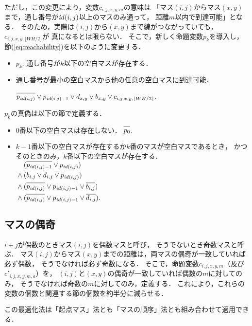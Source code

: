 \documentclass[a4j]{jarticle}
\newcommand{\N}[1]{\overline{#1\vphantom{l}}}
\newcommand{\←}{{\leftarrow}}
\newcommand{\→}{{\rightarrow}}
\newcommand{\↑}{{\uparrow}}
\newcommand{\↓}{{\downarrow}}
\begin{document}
ただし，この変更により，変数$c_{i,j,x,y,m}$の意味は
「マス$(i,j)$からマス$(x,y)$まで，通し番号が$\mathit{id}(i,j)$以上のマスのみ通って，
距離$m$以内で到達可能」となる．
そのため，実際は$(i,j)$から$(x,y)$まで線がつながっていても，
$c_{i,j,x,y,\lfloor WH/2\rfloor}$が
真になるとは限らない．
そこで，新しく命題変数$p_k$を導入し，
節(\ref{eq:reachability})を以下のように変更する．
\begin{itemize}
\item $p_k$: 通し番号が$k$以下の空白マスが存在する．
\item 通し番号が最小の空白マスから他の任意の空白マスに到達可能．
  \par\qquad
  $\N{p_{\id(i,j)}}\lor{p_{\id(i,j)-1}}\lor
   d_{x,y}\lor b_{x,y}\lor
   c_{i,j,x,y,\lfloor WH/2\rfloor}$.

\end{itemize}
%
$p_k$の真偽は以下の節で定義する．
\begin{itemize}
\item $0$番以下の空白マスは存在しない．
  $\N{p_0}$.
\item $k-1$番以下の空白マスが存在するか$k$番のマスが空白マスであるとき，
  かつそのときのみ，$k$番以下の空白マスが存在する．
  $\begin{aligned}[t]
   &(\N{p_{\id(i,j)-1}}\lor p_{\id(i,j)}) \\ {}\land{}
   &(b_{i,j}\lor d_{i,j}\lor p_{\id(i,j)}) \\ {}\land{}
   &(\N{p_{\id(i,j)}}\lor p_{\id(i,j)-1}\lor \N{b_{i,j}}) \\ {}\land{}
   &(\N{p_{\id(i,j)}}\lor p_{\id(i,j)-1}\lor \N{d_{i,j}}).
   \end{aligned}$
\end{itemize}

\subsection{マスの偶奇}
$i+j$が偶数のときマス$(i,j)$を偶数マスと呼び，
そうでないとき奇数マスと呼ぶ．
マス$(i,j)$からマス$(x,y)$までの距離は，両マスの偶奇が一致していれば必ず偶数，
そうでなければ必ず奇数になる．
そこで，命題変数$c_{i,j,x,y,m}$（及び$c'_{i,j,x,y,m,a}$）を，
$(i,j)$と$(x,y)$の偶奇が一致していれば偶数の$m$に対してのみ，
そうでなければ奇数の$m$に対してのみ，定義する．
これにより，これらの変数の個数と関連する節の個数を約半分に減らせる．

この最適化法は「起点マス」法とも「マスの順序」法とも組み合わせて適用できる．
\end{document}
